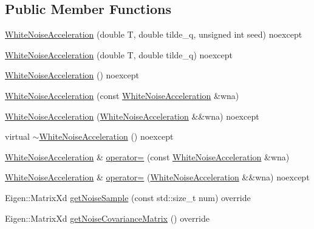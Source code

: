 \subsection*{Public Member Functions}
\begin{DoxyCompactItemize}
\item 
\mbox{\hyperlink{classbfl_1_1WhiteNoiseAcceleration_a89ae84e738630af333280d1f486aedeb}{White\+Noise\+Acceleration}} (double T, double tilde\+\_\+q, unsigned int seed) noexcept
\item 
\mbox{\hyperlink{classbfl_1_1WhiteNoiseAcceleration_a4bb940e3f186a8b6a0181bec3b5c2c40}{White\+Noise\+Acceleration}} (double T, double tilde\+\_\+q) noexcept
\item 
\mbox{\hyperlink{classbfl_1_1WhiteNoiseAcceleration_aae68b94c0d82a6fa594e0e1feba7e272}{White\+Noise\+Acceleration}} () noexcept
\item 
\mbox{\hyperlink{classbfl_1_1WhiteNoiseAcceleration_ac01e4702a8fbce92a7fd0adf74472e5a}{White\+Noise\+Acceleration}} (const \mbox{\hyperlink{classbfl_1_1WhiteNoiseAcceleration}{White\+Noise\+Acceleration}} \&wna)
\item 
\mbox{\hyperlink{classbfl_1_1WhiteNoiseAcceleration_a74f0f6d44c76e10627765d405de96af6}{White\+Noise\+Acceleration}} (\mbox{\hyperlink{classbfl_1_1WhiteNoiseAcceleration}{White\+Noise\+Acceleration}} \&\&wna) noexcept
\item 
virtual \mbox{\hyperlink{classbfl_1_1WhiteNoiseAcceleration_a17d13fe4ece8cb6db9f2423ff48f817d}{$\sim$\+White\+Noise\+Acceleration}} () noexcept
\item 
\mbox{\hyperlink{classbfl_1_1WhiteNoiseAcceleration}{White\+Noise\+Acceleration}} \& \mbox{\hyperlink{classbfl_1_1WhiteNoiseAcceleration_a6f69d09499e7a4746bd823db5fc5ceec}{operator=}} (const \mbox{\hyperlink{classbfl_1_1WhiteNoiseAcceleration}{White\+Noise\+Acceleration}} \&wna)
\item 
\mbox{\hyperlink{classbfl_1_1WhiteNoiseAcceleration}{White\+Noise\+Acceleration}} \& \mbox{\hyperlink{classbfl_1_1WhiteNoiseAcceleration_a4562a1dfc45dd143f7d05fea98e38f42}{operator=}} (\mbox{\hyperlink{classbfl_1_1WhiteNoiseAcceleration}{White\+Noise\+Acceleration}} \&\&wna) noexcept
\item 
Eigen\+::\+Matrix\+Xd \mbox{\hyperlink{classbfl_1_1WhiteNoiseAcceleration_a819bd0d5510c9863272b422ab33b7adc}{get\+Noise\+Sample}} (const std\+::size\+\_\+t num) override
\item 
Eigen\+::\+Matrix\+Xd \mbox{\hyperlink{classbfl_1_1WhiteNoiseAcceleration_a453df5960973059b35ee8686dc12ab0d}{get\+Noise\+Covariance\+Matrix}} () override

\end{DoxyCompactItemize}
